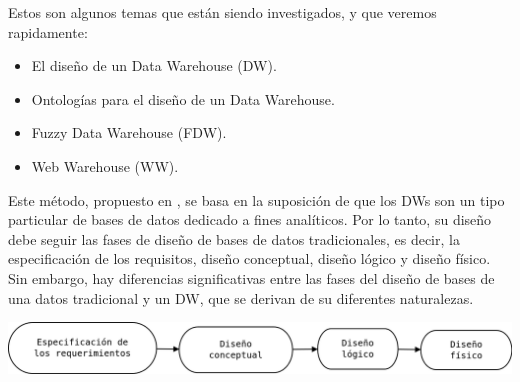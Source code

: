 \documentclass{fancyslides}
\begin{document}
\startingslide %

\begin{frame}
\end{frame}

\begin{frame}
\misc
{
Estos son algunos temas que están siendo investigados, y que veremos rapidamente:
\begin{itemize}
  \item El diseño de un Data Warehouse (DW).
  \item Ontologías para el diseño de un Data Warehouse.
  \item Fuzzy Data Warehouse (FDW).
  \item Web Warehouse (WW).
\end{itemize}
}
\end{frame}

\begin{frame}
\end{frame}

\begin{frame}
\misc
{

 \justifying Este método, propuesto en \cite{VaismanZimanyi14}, se basa en la suposición de que los DWs son un tipo particular de bases de datos dedicado a fines analíticos. Por lo tanto, su diseño debe seguir las fases de diseño de bases de datos tradicionales, es decir, la especificación de los requisitos, diseño conceptual, diseño lógico y diseño físico. Sin embargo, hay diferencias significativas entre las fases del diseño de bases de una datos tradicional y un DW, que se derivan de su diferentes naturalezas.

\begin{center}
\includegraphics[scale=0.25]{diseno1}  
\end{center}

}
\end{frame}
\end{document}
